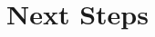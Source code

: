 \documentclass[xcolor=table]{beamer}
\begin{document}
        
        
        


    

\section{Next Steps}
\end{document}
